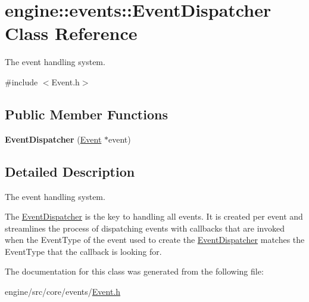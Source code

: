 \hypertarget{classengine_1_1events_1_1EventDispatcher}{}\section{engine\+:\+:events\+:\+:Event\+Dispatcher Class Reference}
\label{classengine_1_1events_1_1EventDispatcher}


The event handling system.  




{\ttfamily \#include $<$Event.\+h$>$}

\subsection*{Public Member Functions}
\begin{DoxyCompactItemize}
\item 
\mbox{\label{classengine_1_1events_1_1EventDispatcher_a1a599ea2862fbf8ccff7510b3d1356f0}} 
{\bfseries Event\+Dispatcher} (\hyperlink{classengine_1_1events_1_1Event}{Event} $\ast$event)
\end{DoxyCompactItemize}


\subsection{Detailed Description}
The event handling system. 

The \hyperlink{classengine_1_1events_1_1EventDispatcher}{Event\+Dispatcher} is the key to handling all events. It is created per event and streamlines the process of dispatching events with callbacks that are invoked when the Event\+Type of the event used to create the \hyperlink{classengine_1_1events_1_1EventDispatcher}{Event\+Dispatcher} matches the Event\+Type that the callback is looking for. 

The documentation for this class was generated from the following file\+:\begin{DoxyCompactItemize}
\item 
engine/src/core/events/\hyperlink{Event_8h}{Event.\+h}\end{DoxyCompactItemize}

